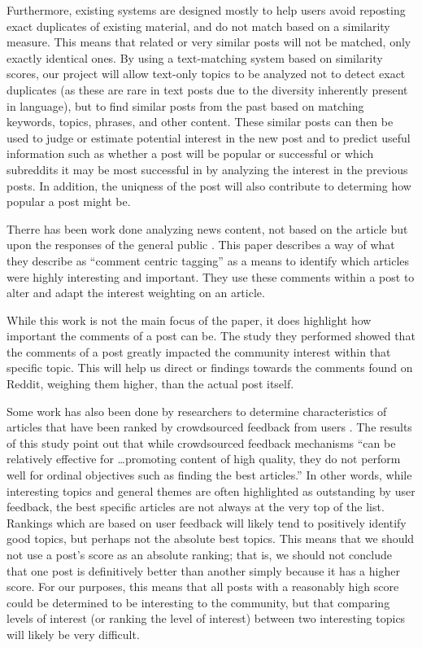 \documentclass{acm_proc_article-sp}
\begin{document}
Furthermore, existing systems are designed mostly to help users avoid reposting exact duplicates of
existing material, and do not match based on a similarity measure.  This means that related or
very similar posts will not be matched, only exactly identical ones.  By using a text-matching system based
on similarity scores,
our project will allow text-only topics to be analyzed not to detect exact duplicates (as these
are rare in text posts due to the diversity inherently present in language), but to find similar
posts from the past based on matching keywords, topics, phrases, and other
content.  These similar posts can then be used to judge or estimate potential interest in the new
post and to predict useful information such as whether a post will be popular or successful or
which subreddits it may be most successful in by analyzing the interest in the previous posts. 
In addition, the uniqness of the post will also contribute to determing how popular a post might be.

Therre has been work done analyzing news content, not based on the article but
upon the responses of the general public \cite{liu:interest}. This paper describes
a way of what they describe as ``comment centric tagging'' as a means to identify
which articles were highly interesting and important. They use these comments within
a post to alter and adapt the interest weighting on an article. 

While this work is not the main focus of the paper, it does highlight how important
the comments of a post can be. The study they performed showed that the comments 
of a post greatly impacted the community interest within that specific topic. This will
help us direct or findings towards the comments found on Reddit, weighing them higher,
than the actual post itself.

Some work has also been done by researchers to determine characteristics of articles that
have been ranked by crowdsourced feedback from users \cite{askalidis:crowdsourced}.
The results of this study point out that while crowdsourced feedback mechanisms ``can be
relatively effective for \ldots promoting content of high quality, they do not perform well
for ordinal objectives such as finding the best articles.''  In other words, while interesting
topics and general themes are often highlighted as outstanding by user feedback, the best
specific articles are not always at the very top of the list.  Rankings which are based on
user feedback will likely tend to positively identify good
topics, but perhaps not the absolute best topics.  This means that we should not use a post's
score as an absolute ranking; that is, we should not conclude that one post is definitively better
than another simply because it has a higher score.  For our purposes, this means that
all posts with a reasonably high score could be determined to be interesting to the
community, but that comparing levels of interest (or ranking the level of interest)
between two interesting topics will likely be very difficult.
\end{document}
